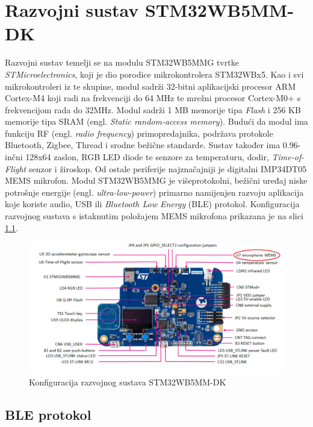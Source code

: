 \chapter{Razvojni sustav STM32WB5MM-DK}

Razvojni sustav temelji se na modulu STM32WB5MMG tvrtke \textit{STMicroelectronics}, koji je dio porodice mikrokontrolera STM32WBx5. Kao i svi mikrokontroleri iz te skupine, modul sadrži 32-bitni aplikacijski procesor ARM Cortex-M4 koji radi na frekvenciji do 64 MHz te mrežni procesor Cortex-M0+ s frekvencijom rada do 32MHz. Modul sadrži 1 MB memorije tipa \textit{Flash} i 256 KB memorije tipa SRAM (engl. \textit{Static random-access memory}).\cite{stm32manual} Budući da modul ima funkciju RF (engl. \textit{radio frequency}) primopredajnika, podržava protokole Bluetooth, Zigbee, Thread i srodne bežične standarde. Sustav također ima 0.96-inčni 128x64 zaslon, RGB LED diode te senzore za temperaturu, dodir, \textit{Time-of-Flight} senzor i žiroskop. Od ostale periferije najznačajniji je digitalni IMP34DT05 MEMS mikrofon. Modul STM32WB5MMG je višeprotokolni, bežični uređaj niske potrošnje energije (engl. \textit{ultra-low-power}) primarno namijenjen razvoju aplikacija koje koriste audio, USB ili \textit{Bluetooth Low Energy} (BLE) protokol. Konfiguracija razvojnog sustava s istaknutim položajem MEMS mikrofona prikazana je na slici \ref{fig:discovery-kit}.

\begin{figure}[ht]
	\includegraphics[scale=0.5]{imgs/discovery_kit}
	\caption{Konfiguracija razvojnog sustava STM32WB5MM-DK \cite{stm32manual}}
	\label{fig:discovery-kit}
\end{figure}

\section{BLE protokol}

